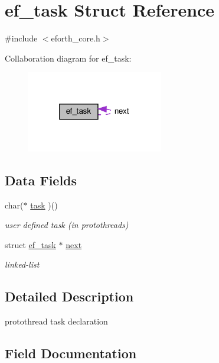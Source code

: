 \hypertarget{structef__task}{}\section{ef\+\_\+task Struct Reference}
\label{structef__task}


{\ttfamily \#include $<$eforth\+\_\+core.\+h$>$}



Collaboration diagram for ef\+\_\+task\+:\nopagebreak
\begin{figure}[H]
\begin{center}
\leavevmode
\includegraphics[width=169pt]{structef__task__coll__graph}
\end{center}
\end{figure}
\subsection*{Data Fields}
\begin{DoxyCompactItemize}
\item 
char($\ast$ \hyperlink{structef__task_a5e340b112e45de9d5398e316d7139115}{task} )()
\begin{DoxyCompactList}\small\item\em user defined task (in protothreads) \end{DoxyCompactList}\item 
struct \hyperlink{structef__task}{ef\+\_\+task} $\ast$ \hyperlink{structef__task_a7ca29f94c5801eeb742c458ab15cb9e4}{next}
\begin{DoxyCompactList}\small\item\em linked-\/list \end{DoxyCompactList}\end{DoxyCompactItemize}


\subsection{Detailed Description}
protothread task declaration 

\subsection{Field Documentation}
\mbox{\label{structef__task_a5e340b112e45de9d5398e316d7139115}} 

